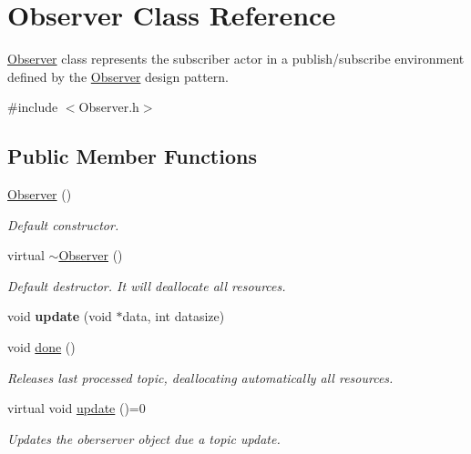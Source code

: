 \hypertarget{class_observer}{\section{Observer Class Reference}
\label{class_observer}
}


\hyperlink{class_observer}{Observer} class represents the subscriber actor in a publish/subscribe environment defined by the \hyperlink{class_observer}{Observer} design pattern.  




{\ttfamily \#include $<$Observer.\-h$>$}

\subsection*{Public Member Functions}
\begin{DoxyCompactItemize}
\item 
\hyperlink{class_observer_a19c43f80a38a332a6f694783df3c9835}{Observer} ()
\begin{DoxyCompactList}\small\item\em Default constructor. \end{DoxyCompactList}\item 
\hypertarget{class_observer_a450645e61c136826f09940a1334c7f34}{virtual \hyperlink{class_observer_a450645e61c136826f09940a1334c7f34}{$\sim$\-Observer} ()}\label{class_observer_a450645e61c136826f09940a1334c7f34}

\begin{DoxyCompactList}\small\item\em Default destructor. It will deallocate all resources. \end{DoxyCompactList}\item 
\hypertarget{class_observer_aa5ff2af13922e7f78fbd131bfabfa404}{void {\bfseries update} (void $\ast$data, int datasize)}\label{class_observer_aa5ff2af13922e7f78fbd131bfabfa404}

\item 
\hypertarget{class_observer_aaeb6a9949f7a983fa2fd21ae4e2bd7ed}{void \hyperlink{class_observer_aaeb6a9949f7a983fa2fd21ae4e2bd7ed}{done} ()}\label{class_observer_aaeb6a9949f7a983fa2fd21ae4e2bd7ed}

\begin{DoxyCompactList}\small\item\em Releases last processed topic, deallocating automatically all resources. \end{DoxyCompactList}\item 
virtual void \hyperlink{class_observer_a3b5b1b520877abff3491995cc35658e0}{update} ()=0
\begin{DoxyCompactList}\small\item\em Updates the oberserver object due a topic update. \end{DoxyCompactList}\end{DoxyCompactItemize}
